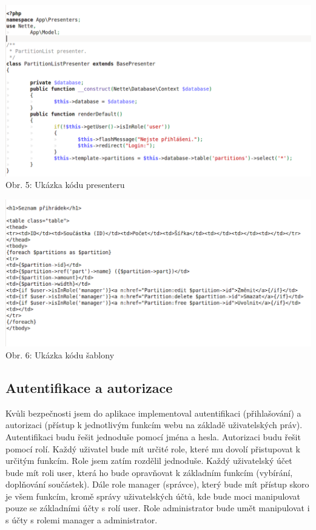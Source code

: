 \documentclass[12pt, a4paper, oneside]{article}
\begin{document}
\begin{minipage}{\textwidth}
\begin{center}
\includegraphics[scale=0.45]{img/code_presenter.png}
\\
\caption{Obr. 5: Ukázka kódu presenteru}
\end{center}
\end{minipage}
\vspace{4mm}

\begin{minipage}{\textwidth}
\begin{center}
\includegraphics[scale=0.45]{img/code_template.png}
\\
\caption{Obr. 6: Ukázka kódu šablony}
\end{center}
\end{minipage}
\vspace{4mm}

\subsection{Autentifikace a autorizace}


Kvůli bezpečnosti jsem do aplikace implementoval autentifikaci (přihlašování) a autorizaci (přístup k jednotlivým funkcím webu na základě uživatelských práv). Autentifikaci budu řešit
jednoduše pomocí jména a hesla. Autorizaci budu řešit pomocí rolí. Každý uživatel bude mít určité role, které mu dovolí přistupovat k určitým funkcím. Role jsem zatím rozdělil jednoduše.
Každý uživatelský účet bude mít roli user, která ho bude opravňovat k základním funkcím (vybírání, doplňování součástek). Dále role manager (správce), který bude mít
přístup skoro je všem funkcím, kromě správy uživatelských účtů, kde bude moci manipulovat pouze se základními účty s rolí user. Role administrator bude umět manipulovat
i s účty s rolemi manager a administrator.
\end{document}
